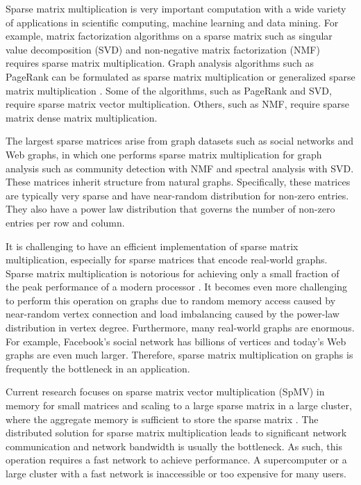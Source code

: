Sparse matrix multiplication is very important computation with a wide variety
of applications in scientific computing, machine learning and data mining.
For example, matrix factorization algorithms on a sparse matrix such as
singular value decomposition (SVD) \cite{svd} and non-negative matrix
factorization (NMF) \cite{nmf} requires sparse matrix multiplication.
Graph analysis algorithms such as PageRank \cite{pagerank} can be
formulated as sparse matrix multiplication or generalized sparse matrix
multiplication \cite{Mattson13}. Some of
the algorithms, such as PageRank and SVD, require sparse matrix vector
multiplication. Others, such as NMF, require sparse matrix dense
matrix multiplication.

The largest sparse matrices arise from graph datasets such as social networks
and Web graphs, in which one performs
sparse matrix multiplication for graph analysis such as community detection
with NMF and spectral analysis with SVD. These matrices inherit structure
from natural graphs. Specifically,
these matrices are typically very sparse and have near-random distribution
for non-zero entries. They also have a power law distribution that governs
the number of non-zero entries per row and column.


It is challenging to have an efficient implementation of sparse matrix
multiplication, especially for sparse matrices that encode real-world graphs.
Sparse matrix multiplication is notorious for achieving only
a small fraction of the peak performance of a modern processor \cite{Williams07}.
It becomes even more challenging to perform this operation on graphs due to
random memory access caused by near-random vertex connection and load imbalancing
caused by the power-law distribution in vertex degree. Furthermore, many
real-world graphs
are enormous. For example, Facebook's social network has billions of vertices
and today's Web graphs are even much larger. %
Therefore, sparse matrix multiplication on graphs is frequently the bottleneck
in an application.

Current research focuses on sparse matrix vector multiplication (SpMV) in memory
for small matrices and scaling to a large sparse matrix in a large cluster,
where the aggregate memory is sufficient to store the sparse matrix
\cite{Williams07, Yoo11, Boman2013}.
The distributed solution for sparse matrix multiplication leads to significant
network communication and network bandwidth is usually the bottleneck.
As such, this operation requires a fast network to achieve performance.
A supercomputer or a large cluster with a fast network is inaccessible or
too expensive for many users.

